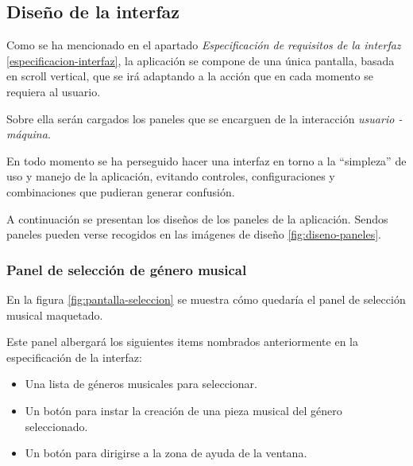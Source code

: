 \subsection{Diseño de la interfaz}

Como se ha mencionado en el apartado \emph{Especificación de requisitos de la interfaz} \ref{especificacion-interfaz}, la aplicación se compone de una única pantalla, basada en scroll vertical, que se irá adaptando a la acción que en cada momento se requiera al usuario.

Sobre ella serán cargados los paneles que se encarguen de la interacción \emph{usuario - máquina}.

En todo momento se ha perseguido hacer una interfaz en torno a la ``simpleza'' de uso y manejo de la aplicación, evitando controles, configuraciones y combinaciones que pudieran generar confusión.

A continuación se presentan los diseños de los paneles de la aplicación. Sendos paneles pueden verse recogidos en las imágenes de diseño \ref{fig:diseno-paneles}.

\subsubsection{Panel de selección de género musical}

En la figura \ref{fig:pantalla-seleccion} se muestra cómo quedaría el panel de selección musical maquetado.


Este panel albergará los siguientes items nombrados anteriormente en la especificación de la interfaz:

\begin{itemize}
    \item Una lista de géneros musicales para seleccionar.
    \item Un botón para instar la creación de una pieza musical del género seleccionado.
    \item Un botón para dirigirse a la zona de ayuda de la ventana.
\end{itemize}

